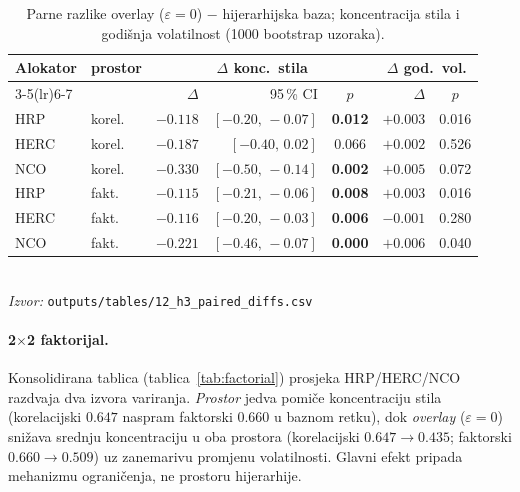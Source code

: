 \documentclass[11pt]{article}
\newcommand{\izvor}[1]{{\footnotesize\textit{Izvor:} \texttt{#1}}}
\begin{document}
\begin{table}[!htbp]
  \centering
  \caption{Parne razlike overlay ($\varepsilon{=}0$) $-$ hijerarhijska baza;
  koncentracija stila i godišnja volatilnost (1000 bootstrap uzoraka).}
  \label{tab:h3}
  \footnotesize
  \setlength{\tabcolsep}{4.5pt}
  \begin{tabular}{llrrc rc}
    \toprule
    Alokator & prostor & \multicolumn{3}{c}{$\Delta$ konc.\ stila} & \multicolumn{2}{c}{$\Delta$ god.\ vol.} \\
    \cmidrule(lr){3-5}\cmidrule(lr){6-7}
     & & $\Delta$ & 95\,\% CI & $p$ & $\Delta$ & $p$ \\
    \midrule
    HRP  & korel. & $-0.118$ & $[-0.20,\,-0.07]$ & \textbf{0.012} & $+0.003$ & 0.016 \\
    HERC & korel. & $-0.187$ & $[-0.40,\,0.02]$  & 0.066 & $+0.002$ & 0.526 \\
    NCO  & korel. & $\mathbf{-0.330}$ & $[-0.50,\,-0.14]$ & \textbf{0.002} & $+0.005$ & 0.072 \\
    HRP  & fakt.  & $-0.115$ & $[-0.21,\,-0.06]$ & \textbf{0.008} & $+0.003$ & 0.016 \\
    HERC & fakt.  & $-0.116$ & $[-0.20,\,-0.03]$ & \textbf{0.006} & $-0.001$ & 0.280 \\
    NCO  & fakt.  & $-0.221$ & $[-0.46,\,-0.07]$ & \textbf{0.000} & $+0.006$ & 0.040 \\
    \bottomrule
  \end{tabular}\\[0.3em]
  \izvor{outputs/tables/12\_h3\_paired\_diffs.csv}
\end{table}

\paragraph{2$\times$2 faktorijal.} Konsolidirana tablica
(tablica~\ref{tab:factorial}) prosjeka HRP/HERC/NCO razdvaja dva izvora variranja.
\emph{Prostor} jedva pomiče koncentraciju stila (korelacijski $0.647$ naspram
faktorski $0.660$ u baznom retku), dok \emph{overlay} ($\varepsilon{=}0$) snižava
srednju koncentraciju u oba prostora (korelacijski $0.647\rightarrow 0.435$;
faktorski $0.660\rightarrow 0.509$) uz zanemarivu promjenu volatilnosti. Glavni
efekt pripada mehanizmu ograničenja, ne prostoru hijerarhije.
\end{document}
